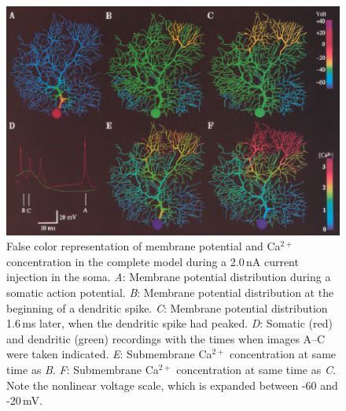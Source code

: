 \documentclass[12pt]{article}
\begin{document}
\clearpage

\begin{figure}[h]
\centering
   \includegraphics[scale=0.75]{figures/Fig.1.10.eps}
   \caption{False color representation of membrane potential and Ca$^{2+}$ concentration in the complete model during a 2.0\,nA current injection in the soma. {\it A}: Membrane potential distribution during a somatic action potential. {\it B}: Membrane potential distribution at the beginning of a dendritic spike. {\it C}: Membrane potential distribution 1.6\,ms later, when the dendritic spike had peaked. {\it D}: Somatic (red) and dendritic (green) recordings with the times when images A--C were taken indicated. {\it E}: Submembrane Ca$^{2+}$ concentration at same time as {\it B}. {\it F}: Submembrane Ca$^{2+}$ concentration at same time as {\it C}. Note the nonlinear voltage scale, which is expanded between -60 and -20\,mV.}
   \label{fig:DS1.10}
\end{figure}

\clearpage
\end{document}
